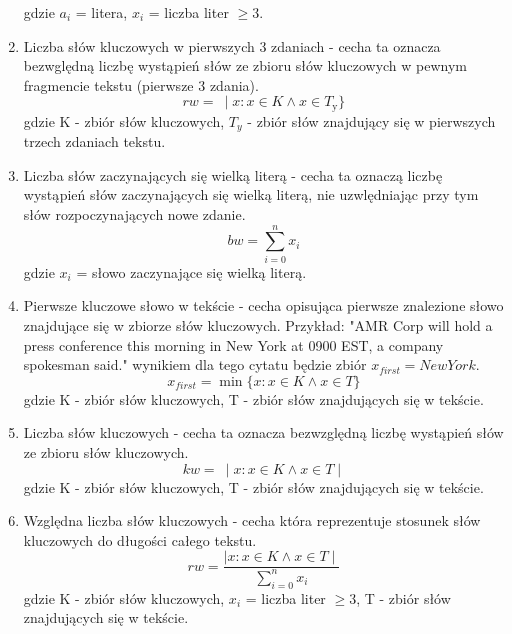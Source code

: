 \documentclass{article}
\begin{document}
\begin{enumerate}
\begin{equation}
        \end{equation}
        gdzie \( a_i \) = litera, \( x_i \) = liczba liter \( \geq 3 \).
    \item Liczba  słów kluczowych w pierwszych 3 zdaniach - cecha ta oznacza bezwględną liczbę wystąpień słów ze zbioru słów kluczowych w pewnym fragmencie tekstu (pierwsze 3 zdania).
        \begin{equation}
            rw = \ \mid x : x \in K \wedge x \in T_{\text{y}} \}
        \end{equation}
        gdzie K - zbiór słów kluczowych, \( T_y \) - zbiór słów znajdujący się w pierwszych trzech zdaniach tekstu.
    \item Liczba słów zaczynających się wielką literą - cecha ta oznaczą liczbę wystąpień słów zaczynających się wielką literą, nie uzwlędniając przy tym słów rozpoczynających nowe zdanie.
        \begin{equation}
            bw = \sum_{i=0}^{n} x_i
        \end{equation}
        gdzie \( x_i \) = słowo zaczynające się wielką literą.
    \item Pierwsze kluczowe słowo w tekście - cecha opisująca pierwsze znalezione słowo znajdujące się w zbiorze słów kluczowych. Przykład: "AMR Corp will hold a press conference this morning in New York at 0900 EST, a company spokesman said." wynikiem dla tego cytatu będzie zbiór \(x_{first} = New York \).
       \begin{equation}
            x_{first} = \min \{x: x \in K \land x \in T \}
        \end{equation}
        gdzie K - zbiór słów kluczowych, T - zbiór słów znajdujących się w tekście.
    \item Liczba słów kluczowych - cecha ta oznacza bezwzględną liczbę wystąpień słów ze zbioru słów kluczowych. 
        \begin{equation}
            kw = \ \mid x : x \in K \land x \in T \mid
        \end{equation}
        gdzie K - zbiór słów kluczowych, T - zbiór słów znajdujących się w tekście.
    \item Względna liczba słów kluczowych - cecha która reprezentuje stosunek słów kluczowych do długości całego tekstu. 
        \begin{equation}
            rw = \frac{ \mid x : x \in K \land x \in T \mid}{ \sum_{i=0}^{n} x_i}
        \end{equation}
       gdzie K - zbiór słów kluczowych, \( x_i \) = liczba liter \( \geq 3 \), T - zbiór słów znajdujących się w tekście.

\end{enumerate}
\end{document}

